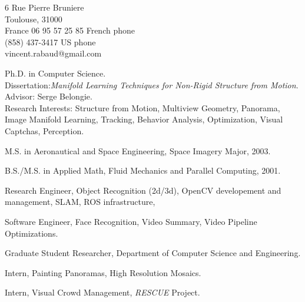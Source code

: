 

\addresses
{6 Rue Pierre Bruniere\\
Toulouse, 31000\\
France}
{
06 95 57 25 85 French phone\\
(858) 437-3417 US phone\\
vincent.rabaud@gmail.com}

\begin{llist}

 
Ph.D. in Computer Science.\\
Dissertation:\textit{Manifold Learning Techniques for Non-Rigid Structure from
Motion}.\\
Advisor: Serge Belongie.\\
Research Interests: Structure from Motion, Multiview Geometry, Panorama, Image Manifold Learning, Tracking, Behavior Analysis, Optimization, Visual Captchas, Perception.

 
M.S. in Aeronautical and Space Engineering, Space Imagery Major, 2003.

 
B.S./M.S. in Applied Math, Fluid Mechanics and Parallel Computing, 2001.

Research Engineer, Object Recognition (2d/3d), OpenCV developement and management, SLAM, ROS infrastructure, 

Software Engineer, Face Recognition, Video Summary, Video Pipeline
Optimizations.

Graduate Student Researcher, Department of Computer Science and Engineering.

Intern, Painting Panoramas, High Resolution Mosaics.

Intern, Visual Crowd Management, {\em RESCUE} Project.


\end{llist}
